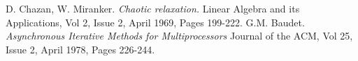 \documentclass[12pt]{article}
\begin{document}
\begin{thebibliography}{2}
D. Chazan, W. Miranker. 
\textit{Chaotic relaxation.} 
Linear Algebra and its Applications, Vol 2, Issue 2, April 1969, Pages 199-222.
G.M. Baudet. 
\textit{Asynchronous Iterative Methods for Multiprocessors} 
Journal of the ACM, Vol 25, Issue 2, April 1978, Pages 226-244.
\end{thebibliography}
\end{document}
